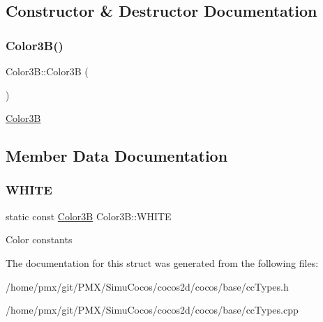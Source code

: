\subsection{Constructor \& Destructor Documentation}
\mbox{\label{structColor3B_a909738e02ed21bd3c29283cf379cc1f8}} 
\subsubsection{\texorpdfstring{Color3\+B()}{Color3B()}}
{\footnotesize\ttfamily Color3\+B\+::\+Color3B (\begin{DoxyParamCaption}{ }\end{DoxyParamCaption})}

\hyperlink{structColor3B}{Color3B} 

\subsection{Member Data Documentation}
\mbox{\label{structColor3B_adf57cb86ca15f434b29215ad471cdc35}} 
\subsubsection{\texorpdfstring{W\+H\+I\+TE}{WHITE}}
{\footnotesize\ttfamily static const \hyperlink{structColor3B}{Color3B} Color3\+B\+::\+W\+H\+I\+TE\hspace{0.3cm}{\ttfamily [static]}}

Color constants 

The documentation for this struct was generated from the following files\+:\begin{DoxyCompactItemize}
\item 
/home/pmx/git/\+P\+M\+X/\+Simu\+Cocos/cocos2d/cocos/base/cc\+Types.\+h\item 
/home/pmx/git/\+P\+M\+X/\+Simu\+Cocos/cocos2d/cocos/base/cc\+Types.\+cpp\end{DoxyCompactItemize}
